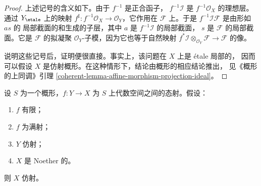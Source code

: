 \begin{proof}
上述记号的含义如下。由于 $f^{-1}$ 是正合函子，
$f^{-1}\mathcal{I}$ 是 $f^{-1}\mathcal{O}_X$ 的理想层。通过
$Y_\etale$ 上的映射
$f^\sharp : f^{-1}\mathcal{O}_X \to \mathcal{O}_Y$，它作用在
$\mathcal{F}$ 上。于是 $f^{-1}\mathcal{I}\mathcal{F}$ 是由形如 $as$ 的
局部截面的和生成的子层，其中 $a$ 是 $f^{-1}\mathcal{I}$ 的局部截面，
$s$ 是 $\mathcal{F}$ 的局部截面。它是 $\mathcal{F}$ 的拟凝聚
$\mathcal{O}_Y$-子模，因为它也等于自然映射
$f^*\mathcal{I} \otimes_{\mathcal{O}_Y} \mathcal{F} \to \mathcal{F}$ 的像。

\medskip\noindent
说明这些记号后，证明便很直接。事实上，该问题在 $X$ 上是 \'etale 局部的，
因而可以假设 $X$ 是仿射概形。在这种情形下，结论由概形的相应结论推出，
见《概形的上同调》引理
\ref{coherent-lemma-affine-morphism-projection-ideal}。
\end{proof}

\begin{lemma}
\label{lemma-image-affine-finite-morphism-affine-Noetherian}
设 $S$ 为一个概形，$f : Y \to X$ 为 $S$ 上代数空间之间的态射。假设：
\begin{enumerate}
\item $f$ 有限；
\item $f$ 为满射；
\item $Y$ 仿射；
\item $X$ 是 Noether 的。
\end{enumerate}
则 $X$ 仿射。
\end{lemma}

